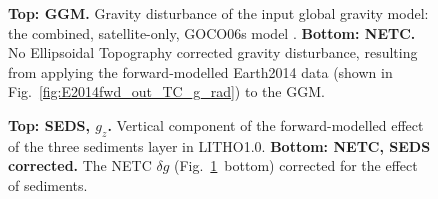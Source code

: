 \begin{figure}
    \begin{adjustbox}{center}
    \end{adjustbox}
    \caption[Map of the global gravity model $\delta g$ and NETC $\delta g$.]{
        \textbf{Top: GGM.} Gravity disturbance of the input global gravity model: the combined, satellite-only, GOCO06s model \parencite{Kvas_GOCO06s_dataset}.
        \textbf{Bottom: NETC.} No Ellipsoidal Topography corrected gravity disturbance, resulting from applying the forward-modelled Earth2014 \parencite{Hirt2015} data (shown in Fig.~\ref{fig:E2014fwd_out_TC_g_rad}) to the GGM.
    }
    \label{fig:SigIs:Res:GGM_BG}
\end{figure}

\begin{figure}
    \begin{adjustbox}{center}
    \end{adjustbox}
    \caption[Map of the effect of sediments ($g_z$) and the NETC $\delta g$ corrected for it.]{
        \textbf{Top: SEDS, $g_z$.} Vertical component of the forward-modelled effect of the three sediments layer in {LITHO1.0}.
        \textbf{Bottom: NETC, SEDS corrected.} The NETC $\delta g$ (Fig.~\ref{fig:SigIs:Res:GGM_BG}~bottom) corrected for the effect of sediments.
    }
    \label{fig:SigIs:Res:SEDS}
\end{figure}

